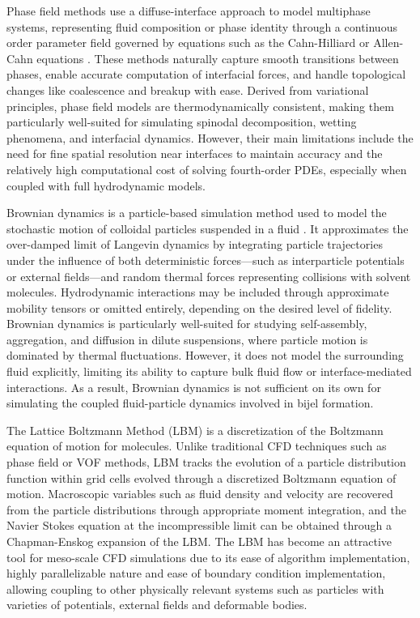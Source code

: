 Phase field methods use a diffuse-interface approach to model multiphase systems, representing fluid composition or phase identity through a continuous 
order parameter field governed by equations such as the Cahn-Hilliard or Allen-Cahn equations 
\cite{mendoza_evolution_2006, carmack_tuning_2018, chan_channel_2012}. These methods naturally capture smooth transitions between phases, enable
accurate computation of interfacial forces, and handle topological changes like coalescence and breakup with ease. Derived from variational principles, 
phase field models are thermodynamically consistent, making them particularly well-suited for simulating spinodal decomposition, wetting phenomena, and 
interfacial dynamics. However, their main limitations include the need for fine spatial resolution near interfaces to maintain accuracy and the relatively 
high computational cost of solving fourth-order PDEs, especially when coupled with full hydrodynamic models.

Brownian dynamics is a particle-based simulation method used to model the stochastic motion of colloidal particles suspended in a fluid 
\cite{huber_brownian_2019, yip_brownian_2005, elsawy_utility_2025}. It approximates the over-damped limit of Langevin dynamics by integrating 
particle trajectories under the influence of both deterministic forces—such as interparticle potentials or external fields—and random thermal 
forces representing collisions with solvent molecules. Hydrodynamic interactions may be included through approximate mobility tensors or omitted 
entirely, depending on the desired level of fidelity. Brownian dynamics is particularly well-suited for studying self-assembly, aggregation, and 
diffusion in dilute suspensions, where particle motion is dominated by thermal fluctuations. However, it does not model the surrounding fluid 
explicitly, limiting its ability to capture bulk fluid flow or interface-mediated interactions. As a result, Brownian dynamics is not sufficient 
on its own for simulating the coupled fluid-particle dynamics involved in bijel formation.

The Lattice Boltzmann Method (LBM) is a discretization of the Boltzmann equation of motion for molecules. \cite{qian_lattice_1992, succi_lattice_2018, shan_multicomponent_1995, swift_lattice_1996}
Unlike traditional CFD techniques such as phase field or VOF methods, LBM tracks the evolution of a 
particle distribution function within grid cells evolved through a discretized Boltzmann equation of motion. Macroscopic variables such as fluid density and 
velocity are recovered from the particle distributions through appropriate moment integration, and the Navier Stokes equation at the incompressible limit can be 
obtained through a Chapman-Enskog expansion of the LBM. \cite{qian_lattice_1992} The LBM has become an attractive tool for meso-scale CFD simulations due to its ease of algorithm 
implementation, highly parallelizable nature and ease of boundary condition implementation, allowing coupling to other physically relevant systems such as 
particles with varieties of potentials, external fields and deformable bodies.

